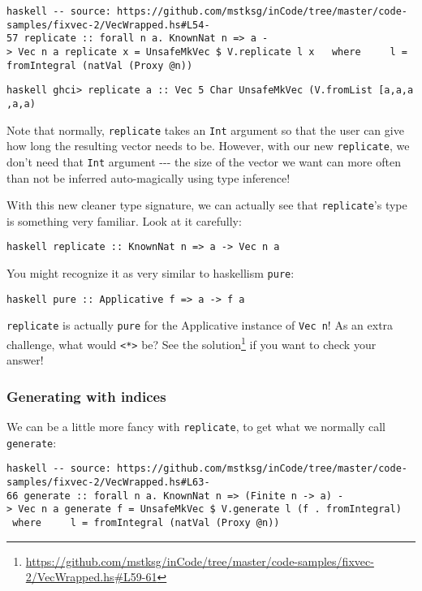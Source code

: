 \documentclass[]{article}
\renewcommand{\href}[2]{#2\footnote{\url{#1}}}
\begin{document}
\texttt{haskell\ -\/-\ source:\ https://github.com/mstksg/inCode/tree/master/code-samples/fixvec-2/VecWrapped.hs\#L54-57\ replicate\ ::\ forall\ n\ a.\ KnownNat\ n\ =\textgreater{}\ a\ -\textgreater{}\ Vec\ n\ a\ replicate\ x\ =\ UnsafeMkVec\ \$\ V.replicate\ l\ x\ \ \ where\ \ \ \ \ l\ =\ fromIntegral\ (natVal\ (Proxy\ @n))}

\texttt{haskell\ ghci\textgreater{}\ replicate\ \textquotesingle{}a\textquotesingle{}\ ::\ Vec\ 5\ Char\ UnsafeMkVec\ (V.fromList\ {[}\textquotesingle{}a\textquotesingle{},\textquotesingle{}a\textquotesingle{},\textquotesingle{}a\textquotesingle{},\textquotesingle{}a\textquotesingle{},\textquotesingle{}a\textquotesingle{}{]})}

Note that normally, \texttt{replicate} takes an \texttt{Int} argument so that
the user can give how long the resulting vector needs to be. However, with our
new \texttt{replicate}, we don't need that \texttt{Int} argument -\/-\/- the
size of the vector we want can more often than not be inferred auto-magically
using type inference!

With this new cleaner type signature, we can actually see that
\texttt{replicate}'s type is something very familiar. Look at it carefully:

\texttt{haskell\ replicate\ ::\ KnownNat\ n\ =\textgreater{}\ a\ -\textgreater{}\ Vec\ n\ a}

You might recognize it as very similar to haskellism \texttt{pure}:

\texttt{haskell\ pure\ ::\ Applicative\ f\ =\textgreater{}\ a\ -\textgreater{}\ f\ a}

\texttt{replicate} is actually \texttt{pure} for the Applicative instance of
\texttt{Vec\ n}! As an extra challenge, what would
\texttt{\textless{}*\textgreater{}} be? See
\href{https://github.com/mstksg/inCode/tree/master/code-samples/fixvec-2/VecWrapped.hs\#L59-61}{the
solution} if you want to check your answer!

\subsubsection{Generating with indices}

We can be a little more fancy with \texttt{replicate}, to get what we normally
call \texttt{generate}:

\texttt{haskell\ -\/-\ source:\ https://github.com/mstksg/inCode/tree/master/code-samples/fixvec-2/VecWrapped.hs\#L63-66\ generate\ ::\ forall\ n\ a.\ KnownNat\ n\ =\textgreater{}\ (Finite\ n\ -\textgreater{}\ a)\ -\textgreater{}\ Vec\ n\ a\ generate\ f\ =\ UnsafeMkVec\ \$\ V.generate\ l\ (f\ .\ fromIntegral)\ \ \ where\ \ \ \ \ l\ =\ fromIntegral\ (natVal\ (Proxy\ @n))}
\end{document}
